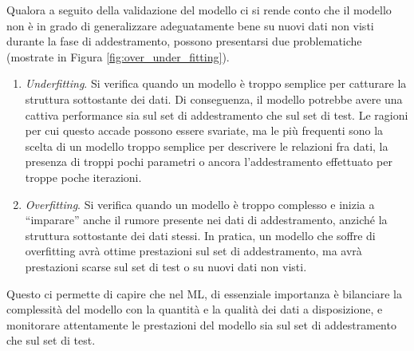 \documentclass[12pt,a4paper,twoside,openright]{book}
\begin{document}
Qualora a seguito della validazione del modello ci si rende conto che il modello non è in grado di generalizzare adeguatamente bene su nuovi dati non visti durante la fase di addestramento, possono presentarsi due problematiche (mostrate in Figura \ref{fig:over_under_fitting}).
\begin{enumerate}
    \item \emph{Underfitting}. Si verifica quando un modello è troppo semplice per catturare la struttura sottostante dei dati. Di conseguenza, il modello potrebbe avere una cattiva performance sia sul set di addestramento che sul set di test. Le ragioni per cui questo accade possono essere svariate, ma le più frequenti sono la scelta di un modello troppo semplice per descrivere le relazioni fra dati, la presenza di troppi pochi parametri o ancora l'addestramento effettuato per troppe poche iterazioni.
    \item \emph{Overfitting}. Si verifica quando un modello è troppo complesso e inizia a ``imparare'' anche il rumore presente nei dati di addestramento, anziché la struttura sottostante dei dati stessi. In pratica, un modello che soffre di overfitting avrà ottime prestazioni sul set di addestramento, ma avrà prestazioni scarse sul set di test o su nuovi dati non visti.
\end{enumerate}

Questo ci permette di capire che nel ML, di essenziale importanza è bilanciare la complessità del modello con la quantità e la qualità dei dati a disposizione, e monitorare attentamente le prestazioni del modello sia sul set di addestramento che sul set di test.
\end{document}
